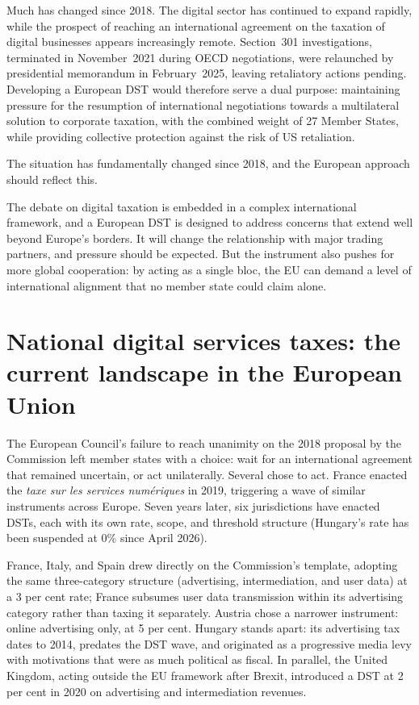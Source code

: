 \documentclass[../../main]{subfiles}
\begin{document}
Much has changed since 2018. 
The digital sector has continued to expand rapidly, while the prospect of reaching an international agreement on the taxation of digital businesses appears increasingly remote. 
Section~301 investigations, terminated in November~2021 during OECD negotiations, were relaunched by presidential memorandum in February~2025, leaving retaliatory actions pending.
Developing a European DST would therefore serve a dual purpose: maintaining pressure for the resumption of international negotiations towards a multilateral solution to corporate taxation, with the combined weight of 27 Member States, while providing collective protection against the risk of US retaliation.

The situation has fundamentally changed since 2018, and the European approach should reflect this.




The debate on digital taxation is embedded in a complex international framework, and a European DST is designed to address concerns that extend well beyond Europe's borders.
It will change the relationship with major trading partners, and pressure should be expected.
But the instrument also pushes for more global cooperation: by acting as a single bloc, the EU can demand a level of international alignment that no member state could claim alone.

\section{National digital services taxes: the current landscape in the European Union}
\label{sec:landscape}

The European Council's failure to reach unanimity on the 2018 proposal by the Commission left member states with a choice: wait for an international agreement that remained uncertain, or act unilaterally.
Several chose to act.
France enacted the \emph{taxe sur les services numériques} in 2019, triggering a wave of similar instruments across Europe.
Seven years later, six jurisdictions have enacted DSTs, each with its own rate, scope, and threshold structure (Hungary's rate has been suspended at 0\% since April 2026).

France, Italy, and Spain drew directly on the Commission's template, adopting the same three-category structure (advertising, intermediation, and user data) at a 3 per cent rate; France subsumes user data transmission within its advertising category rather than taxing it separately.
Austria chose a narrower instrument: online advertising only, at 5 per cent.
Hungary stands apart: its advertising tax dates to 2014, predates the DST wave, and originated as a progressive media levy with motivations that were as much political as fiscal.
In parallel, the United Kingdom, acting outside the EU framework after Brexit, introduced a DST at 2 per cent in 2020 on advertising and intermediation revenues.
\end{document}
